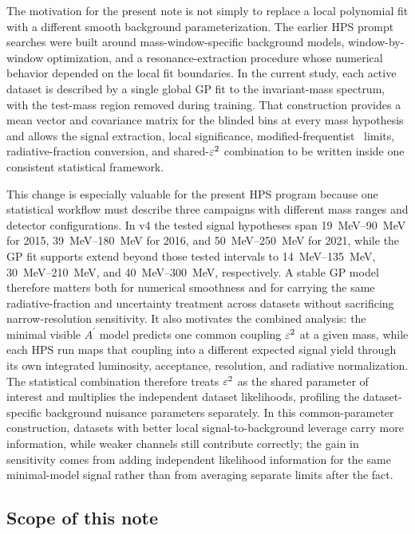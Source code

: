 The motivation for the present note is not simply to replace a local polynomial fit
with a different smooth background parameterization. The earlier HPS prompt searches
were built around mass-window-specific background models, window-by-window optimization,
and a resonance-extraction procedure whose numerical behavior depended on the local fit
boundaries. In the current study, each active dataset is described by a single global
GP fit to the invariant-mass spectrum, with the test-mass region removed during
training. That construction provides a mean vector and covariance matrix for the
blinded bins at every mass hypothesis and allows the signal extraction, local
significance, modified-frequentist \CLs\ limits, radiative-fraction conversion, and shared-$\varepsilon^2$
combination to be written inside one consistent statistical framework.

This change is especially valuable for the present HPS program because one statistical
workflow must describe three campaigns with different mass ranges and detector
configurations. In v4 the tested signal hypotheses span \SIrange{19}{90}{MeV} for
2015, \SIrange{39}{180}{MeV} for 2016, and \SIrange{50}{250}{MeV} for 2021, while
the GP fit supports extend beyond those tested intervals to
\SIrange{14}{135}{MeV}, \SIrange{30}{210}{MeV}, and
\SIrange{40}{300}{MeV}, respectively. A stable GP model therefore matters both for
numerical smoothness and for carrying the same radiative-fraction and uncertainty
treatment across datasets without sacrificing narrow-resolution sensitivity. It also
motivates the combined analysis:
the minimal visible $A^\prime$ model predicts one common coupling $\varepsilon^2$ at a given
mass, while each HPS run maps that coupling into a different expected signal yield
through its own integrated luminosity, acceptance, resolution, and radiative
normalization. The
statistical combination therefore treats $\varepsilon^2$ as the shared parameter of interest
and multiplies the independent dataset likelihoods, profiling the dataset-specific
background nuisance parameters separately. In this common-parameter construction,
datasets with better local signal-to-background leverage carry more information, while
weaker channels still contribute correctly; the gain in sensitivity comes from adding
independent likelihood information for the same minimal-model signal rather than from
averaging separate limits after the fact.

\subsection{Scope of this note}

